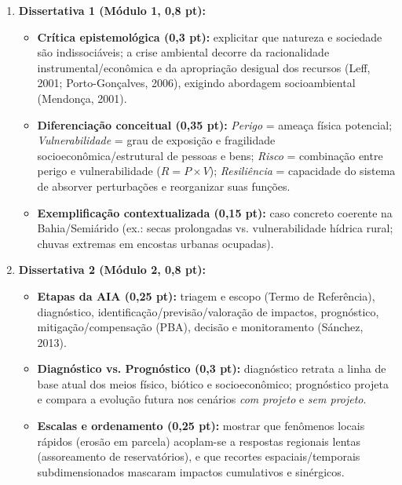 \begin{boxConceito}
\small
\begin{enumerate}[leftmargin=1.6em, itemsep=5pt]
  \item \textbf{Dissertativa 1 (Módulo 1, 0,8 pt):}
  \begin{itemize}[leftmargin=1.4em, itemsep=1pt, topsep=2pt]
    \item \textbf{Crítica epistemológica (0,3 pt):} explicitar que natureza e sociedade são indissociáveis; a crise ambiental decorre da racionalidade instrumental/econômica e da apropriação desigual dos recursos (Leff, 2001; Porto-Gonçalves, 2006), exigindo abordagem socioambiental (Mendonça, 2001).
    \item \textbf{Diferenciação conceitual (0,35 pt):} \textit{Perigo} = ameaça física potencial; \textit{Vulnerabilidade} = grau de exposição e fragilidade socioeconômica/estrutural de pessoas e bens; \textit{Risco} = combinação entre perigo e vulnerabilidade ($R = P \times V$); \textit{Resiliência} = capacidade do sistema de absorver perturbações e reorganizar suas funções.
    \item \textbf{Exemplificação contextualizada (0,15 pt):} caso concreto coerente na Bahia/Semiárido (ex.: secas prolongadas vs. vulnerabilidade hídrica rural; chuvas extremas em encostas urbanas ocupadas).
  \end{itemize}

  \item \textbf{Dissertativa 2 (Módulo 2, 0,8 pt):}
  \begin{itemize}[leftmargin=1.4em, itemsep=1pt, topsep=2pt]
    \item \textbf{Etapas da AIA (0,25 pt):} triagem e escopo (Termo de Referência), diagnóstico, identificação/previsão/valoração de impactos, prognóstico, mitigação/compensação (PBA), decisão e monitoramento (Sánchez, 2013).
    \item \textbf{Diagnóstico vs. Prognóstico (0,3 pt):} diagnóstico retrata a linha de base atual dos meios físico, biótico e socioeconômico; prognóstico projeta e compara a evolução futura nos cenários \textit{com projeto} e \textit{sem projeto}.
    \item \textbf{Escalas e ordenamento (0,25 pt):} mostrar que fenômenos locais rápidos (erosão em parcela) acoplam-se a respostas regionais lentas (assoreamento de reservatórios), e que recortes espaciais/temporais subdimensionados mascaram impactos cumulativos e sinérgicos.
  \end{itemize}


\end{enumerate}
\end{boxConceito}

